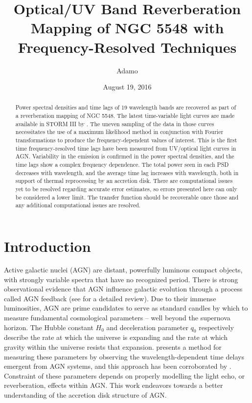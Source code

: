 \documentclass[11pt,letterpaper]{article}
\begin{document}
\title{Optical/UV Band
Reverberation Mapping of NGC 5548 with Frequency-Resolved Techniques}

\author{Adamo}
\date{August 19, 2016}

\maketitle

\begin{abstract}

Power spectral densities and time lags of 19 wavelength bands are recovered as part of a reverberation mapping of NGC 5548. The latest time-variable light curves are made available in STORM III by \cite{2016ApJ...821...56F}. The uneven sampling of the data in those curves necessitates the use of a maximum likelihood method in conjunction with Fourier transformations to produce the frequency-dependent values of interest. This is the first time frequency-resolved time lags have been measured from UV/optical light curves in AGN. Variability in the emission is confirmed in the power spectral densities, and the time lags show a complex frequency dependence. The total power seen in each PSD decreases with wavelength, and the average time lag increases with wavelength, both in support of thermal reprocessing by an accretion disk. There are computational issues yet to be resolved regarding accurate error estimates, so errors presented here can only be considered a lower limit. The transfer function should be recoverable once those and any additional computational issues are resolved.

\end{abstract}


\section{Introduction}
\label{sec:intro}

Active galactic nuclei (AGN) are distant, powerfully luminous compact objects, with strongly variable spectra that have no recognized period. There is strong observational evidence that AGN influence galactic evolution through a process called AGN feedback (see \cite{2012ARA&A..50..455F} for a detailed review). Due to their immense luminosities, AGN are prime candidates to serve as standard candles by which to measure fundamental cosmological parameters -- well beyond the supernova horizon. The Hubble constant $H_0$ and deceleration parameter $q_0$ respectively describe the rate at which the universe is expanding and the rate at which gravity within the universe resists that expansion. \cite{1999MNRAS.302L..24C} presents a method for measuring these parameters by observing the wavelength-dependent time delays emergent from AGN systems, and this approach has been corroborated by \cite{2007MNRAS.380..669C}. Constraint of these parameters depends on properly modelling the light echo, or reverberation, effects within AGN. This work endeavors towards a better understanding of the accretion disk structure of AGN.
\end{document}
